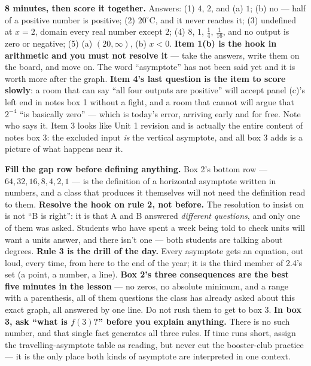 \documentclass[10pt]{article}
\begin{document}
\boxguard[18]
\begin{teachernote}[Warm-Up]
    \textbf{8 minutes, then score it together.} Answers: (1) $4$, $2$, and (a) $1$; (b) no --- half
    of a positive number is positive; (2) $20^\circ$C, and it never reaches it; (3) undefined at
    $x=2$, domain every real number except $2$; (4) $8$, $1$, $\tfrac14$, $\tfrac{1}{16}$, and no
    output is zero or negative; (5) (a) $(20,\infty)$, (b) $x<0$. \textbf{Item 1(b) is the hook in
    arithmetic and you must not resolve it} --- take the answers, write them on the board, and move
    on. The word ``asymptote'' has not been said yet and it is worth more after the graph. \textbf{Item
    4's last question is the item to score slowly}: a room that can say ``all four outputs are
    positive'' will accept panel (c)'s left end in notes box 1 without a fight, and a room that cannot
    will argue that $2^{-4}$ ``is basically zero'' --- which is today's error, arriving early and for
    free. Note who says it. Item 3 looks like Unit 1 revision and is actually the entire content of
    notes box 3: the excluded input \emph{is} the vertical asymptote, and all box 3 adds is a picture
    of what happens near it.
\end{teachernote}

\boxguard[18]
\begin{teachernote}
    \textbf{Fill the gap row before defining anything.} Box 2's bottom row --- $64, 32, 16, 8, 4, 2,
    1$ --- is the definition of a horizontal asymptote written in numbers, and a class that produces
    it themselves will not need the definition read to them. \textbf{Resolve the hook on rule 2, not
    before.} The resolution to insist on is not ``B is right'': it is that A and B answered
    \emph{different questions}, and only one of them was asked. Students who have spent a week being
    told to check units will want a units answer, and there isn't one --- both students are talking
    about degrees. \textbf{Rule 3 is the drill of the day.} Every asymptote gets an equation, out
    loud, every time, from here to the end of the year; it is the third member of 2.4's set (a point,
    a number, a line). \textbf{Box 2's three consequences are the best five minutes in the lesson} ---
    no zeros, no absolute minimum, and a range with a parenthesis, all of them questions the class has
    already asked about this exact graph, all answered by one line. Do not rush them to get to box 3.
    \textbf{In box 3, ask ``what is $f(3)$?'' before you explain anything.} There is no such number,
    and that single fact generates all three rules. If time runs short, assign the travelling-asymptote
    table as reading, but never cut the booster-club practice --- it is the only place both kinds of
    asymptote are interpreted in one context.
\end{teachernote}
\end{document}

